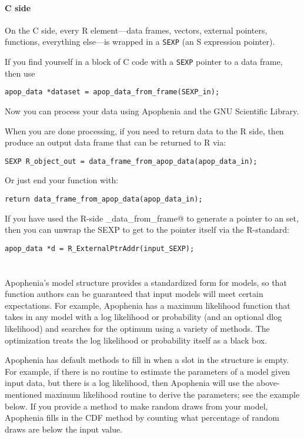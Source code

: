 \documentclass{article}
\begin{document}
\paragraph{C side} 
On the C side, every R element---data frames, vectors, external pointers, functions,
everything else---is wrapped in a {\tt SEXP} (an S expression pointer). 

If you find yourself in a block of C code with a {\tt SEXP} pointer to a data frame, then
use 

\begin{verbatim}
apop_data *dataset = apop_data_from_frame(SEXP_in);
\end{verbatim}

Now you can process your data using Apophenia and the GNU Scientific Library.

When you are done processing, if you need to return data to the R side, then 
produce an output data frame that can be returned to R via:

\begin{verbatim}
SEXP R_object_out = data_frame_from_apop_data(apop_data_in);
\end{verbatim}

Or just end your function with:
\begin{verbatim}
return data_frame_from_apop_data(apop_data_in);
\end{verbatim}


If you have used the R-side \verb@apop_data_from_frame@ to generate a pointer to an \ad
set, then you can unwrap the SEXP to get to the pointer itself via the R-standard:
\begin{verbatim}
apop_data *d = R_ExternalPtrAddr(input_SEXP);
\end{verbatim}


\section{\am} Apophenia's model structure provides a standardized form for models, so that
function authors can be guaranteed that input models will meet certain expectations. For
example, Apophenia has a maximum likelihood function that takes in any model with a log
likelihood or probability (and an optional dlog likelihood) and searches for the optimum
using a variety of methods. The optimization treats the log likelihood or probability
itself as a black box.

Apophenia has default methods to fill in when a slot in the structure is empty. For
example, if there is no routine to estimate the parameters of a model given input data,
but there is a log likelihood, then Apophenia will use the above-mentioned maximum
likelihood routine to derive the parameters; see the example below. If you provide a
method to make random draws from your model, Apophenia fills in the CDF method by
counting what percentage of random draws are below the input value.
\end{document}
